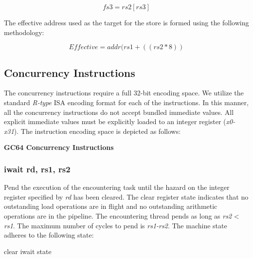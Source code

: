 \documentclass{article}
\begin{document}
\begin{equation}
fs3 = rs2[rs3]
\end{equation}

The effective address used as the target
for the store is formed using the following methodology:

\begin{equation}
Effective = addr(rs1 + ((rs2 * 8))
\end{equation}


\subsection{Concurrency Instructions}

The concurrency instructions require a full 32-bit encoding space.  
We utilize the standard \emph{R-type} ISA encoding format for each 
of the instructions.  In this manner, all the concurrency instructions
do not accept bundled immediate values.  All explicit immediate values
must be explicitly loaded to an integer register (\emph{x0-x31}).  The 
instruction encoding space is depicted as follows: 

\begin{center}
\textbf{GC64 Concurrency Instructions}
\makebox[0.03in][s]{}\makebox[0.03in][s]{}\makebox[0.03in][s]{}\makebox[0.03in][s]{}\makebox[0.03in][s]{}
\end{center}

\subsubsection{iwait rd, rs1, rs2}

Pend the execution of the encountering task until the hazard
on the integer register specified by \emph{rd} has been cleared. 
The clear register state indicates that no outstanding load 
operations are in flight and no outstanding arithmetic 
operations are in the pipeline.  The encountering thread
pends as long as \emph{rs2} < \emph{rs1}.  The maximum number of cycles to
pend is \emph{rs1-rs2}.  The machine state adheres to the following state: 

\begin{algorithm}[H]
 clear iwait state
\end{algorithm}
\end{document}
